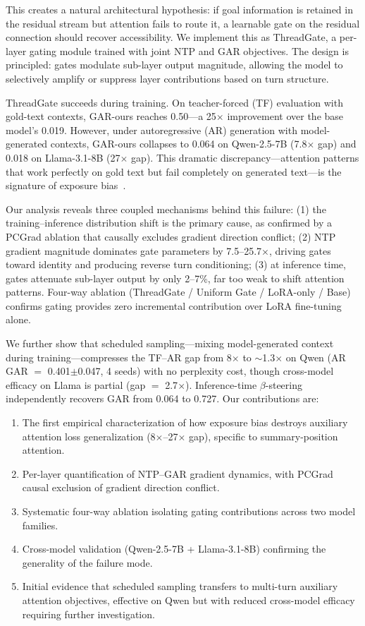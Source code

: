 \documentclass[11pt,a4paper]{article}
\begin{document}
This creates a natural architectural hypothesis: if goal information is retained in the residual stream but attention fails to route it, a learnable gate on the residual connection should recover accessibility. We implement this as ThreadGate, a per-layer gating module trained with joint NTP and GAR objectives. The design is principled: gates modulate sub-layer output magnitude, allowing the model to selectively amplify or suppress layer contributions based on turn structure.

ThreadGate succeeds during training. On teacher-forced (TF) evaluation with gold-text contexts, GAR-ours reaches 0.50---a 25$\times$ improvement over the base model's 0.019. However, under autoregressive (AR) generation with model-generated contexts, GAR-ours collapses to 0.064 on Qwen-2.5-7B (7.8$\times$ gap) and 0.018 on Llama-3.1-8B (27$\times$ gap). This dramatic discrepancy---attention patterns that work perfectly on gold text but fail completely on generated text---is the signature of exposure bias~\cite{bengio2015scheduled,ranzato2016sequence}.

Our analysis reveals three coupled mechanisms behind this failure: (1) the training--inference distribution shift is the primary cause, as confirmed by a PCGrad ablation that causally excludes gradient direction conflict; (2) NTP gradient magnitude dominates gate parameters by 7.5--25.7$\times$, driving gates toward identity and producing reverse turn conditioning; (3) at inference time, gates attenuate sub-layer output by only 2--7\%, far too weak to shift attention patterns. Four-way ablation (ThreadGate / Uniform Gate / LoRA-only / Base) confirms gating provides zero incremental contribution over LoRA fine-tuning alone.

We further show that scheduled sampling---mixing model-generated context during training---compresses the TF--AR gap from 8$\times$ to ${\sim}$1.3$\times$ on Qwen (AR GAR $=$ 0.401$\pm$0.047, 4 seeds) with no perplexity cost, though cross-model efficacy on Llama is partial (gap $=$ 2.7$\times$). Inference-time $\beta$-steering independently recovers GAR from 0.064 to 0.727. Our contributions are:
\begin{enumerate}
    \item The first empirical characterization of how exposure bias destroys auxiliary attention loss generalization (8$\times$--27$\times$ gap), specific to summary-position attention.
    \item Per-layer quantification of NTP--GAR gradient dynamics, with PCGrad causal exclusion of gradient direction conflict.
    \item Systematic four-way ablation isolating gating contributions across two model families.
    \item Cross-model validation (Qwen-2.5-7B + Llama-3.1-8B) confirming the generality of the failure mode.
    \item Initial evidence that scheduled sampling transfers to multi-turn auxiliary attention objectives, effective on Qwen but with reduced cross-model efficacy requiring further investigation.
\end{enumerate}
\end{document}
